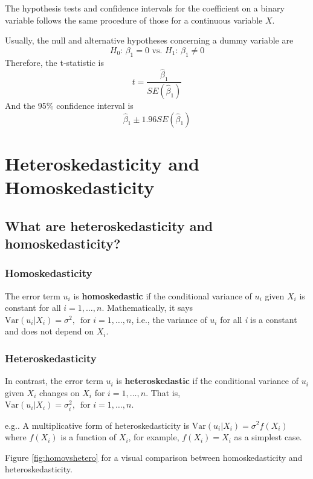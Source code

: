 \documentclass[a4paper,11pt]{article}
\newcommand{\var}{\mathrm{Var}}
\begin{document}
The hypothesis tests and confidence intervals for the coefficient on a
binary variable follows the same procedure of those for a continuous
variable \(X\). 

Usually, the null and alternative hypotheses concerning a dummy variable are
\[ H_0:\, \beta_1 = 0 \text{ vs. } H_1:\, \beta_1 \neq 0 \]
Therefore, the t-statistic is 
\[ t = \frac{\hat{\beta}_1}{SE(\hat{\beta}_1)} \]
And the 95\% confidence interval is
\[ \hat{\beta}_1 \pm 1.96 SE(\hat{\beta}_1) \]


\section{Heteroskedasticity and Homoskedasticity}
\label{sec:org4a62b2a}

\subsection{What are heteroskedasticity and homoskedasticity?}
\label{sec:org9a6b28d}

\subsubsection*{Homoskedasticity}
\label{sec:org723b4a5}

The error term \(u_i\) is \textbf{homoskedastic} if the conditional variance of
\(u_i\) given \(X_i\) is constant for all \(i = 1, \ldots, n\). Mathematically,
it says \(\var(u_i | X_i) = \sigma^2,\, \text{ for } i = 1, \ldots, n\),
i.e., the variance of \(u_i\) for all \emph{i} is a constant and does not
depend on \(X_i\).

\subsubsection*{Heteroskedasticity}
\label{sec:org9fffc1a}
In contrast, the error term \(u_i\) is \textbf{heteroskedastic} if the conditional variance of
\(u_i\) given \(X_i\) changes on \(X_i\) for \(i = 1, \ldots, n\). That is,
\(\var(u_i | X_i) = \sigma^2_i,\, \text{ for } i = 1, \ldots, n\). 

e.g.. A multiplicative form of heteroskedasticity is \(\var(u_i|X_i)
= \sigma^2 f(X_i)\) where \(f(X_i)\) is a function of \(X_i\), for
example, \(f(X_i) = X_i\) as a simplest case. 

Figure \ref{fig:homovshetero} for a visual comparison between
homoskedasticity and heteroskedasticity. 
\end{document}
